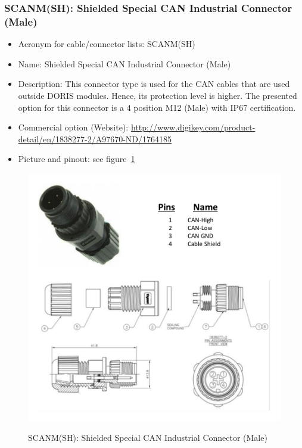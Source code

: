 \subsubsection{SCANM(SH): Shielded Special CAN Industrial Connector (Male)} \label{DEVICE:SCANM(SH)}
\begin{itemize}
  \item Acronym for cable/connector lists: SCANM(SH)
  \item Name: Shielded Special CAN Industrial Connector (Male)
  \item Description: This connector type is used for the CAN cables that are used outside DORIS modules. Hence, its protection level is higher. The presented option for this connector is a 4 position M12 (Male) with IP67 certification.
  \item Commercial option (Website): \href{http://www.digikey.com/product-detail/en/1838277-2/A97670-ND/1764185}{http://www.digikey.com/product-detail/en/1838277-2/A97670-ND/1764185}
  \item Picture and pinout: see figure~\ref{FIG:DEVICESCANM(SH)}
\end{itemize}
\begin{figure}
  \centering
  \includegraphics[angle=90,width=1\columnwidth]{figs/body02/FIGDEVICESCANM(SH).pdf}\\
  \caption[SCANM(SH): Shielded Special CAN Industrial Connector (Male)]{SCANM(SH): Shielded Special CAN Industrial Connector (Male)}
  \label{FIG:DEVICESCANM(SH)}
\end{figure}
